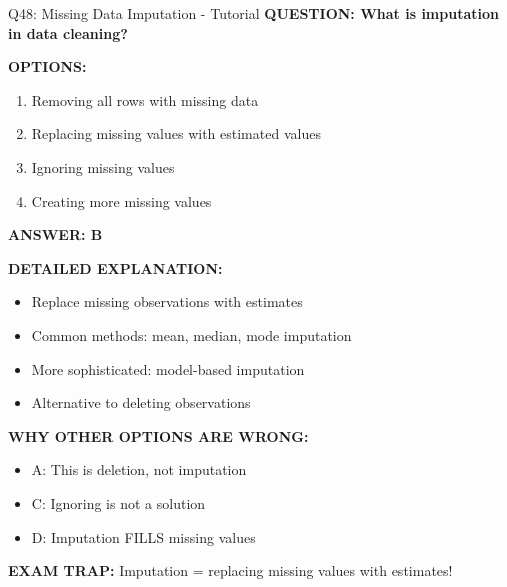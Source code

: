 \documentclass[8pt]{beamer}
\begin{document}
	\begin{frame}{Q48: Missing Data Imputation - Tutorial}
		\fontsize{6.5}{7.5}\selectfont
		\textbf{QUESTION: What is imputation in data cleaning?}
		
		\vspace{0.1cm}
		\textbf{OPTIONS:}
		\begin{enumerate}
			\item Removing all rows with missing data
			\item Replacing missing values with estimated values
			\item Ignoring missing values
			\item Creating more missing values
		\end{enumerate}
		
		\vspace{0.1cm}
		\textcolor{myblue}{\textbf{ANSWER: B}}
		
		\vspace{0.1cm}
		\textbf{DETAILED EXPLANATION:}
		\begin{itemize}
			\item Replace missing observations with estimates
			\item Common methods: mean, median, mode imputation
			\item More sophisticated: model-based imputation
			\item Alternative to deleting observations
		\end{itemize}
		
		\vspace{0.1cm}
		\textcolor{myred}{\textbf{WHY OTHER OPTIONS ARE WRONG:}}
		\begin{itemize}
			\item \textcolor{myred}{A:} This is deletion, not imputation
			\item \textcolor{myred}{C:} Ignoring is not a solution
			\item \textcolor{myred}{D:} Imputation FILLS missing values
		\end{itemize}
		
		\textcolor{myred}{\textbf{EXAM TRAP:}} Imputation = \textcolor{myblue}{replacing missing values with estimates}!
	\end{frame}
	
\end{document}
